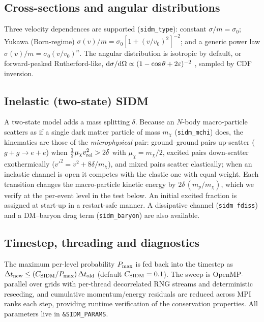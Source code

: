\documentclass[11pt,a4paper]{article}
\newcommand{\code}[1]{\texttt{#1}}
\begin{document}
\subsection{Cross-sections and angular distributions}

Three velocity dependences are supported
(\code{sidm\_type}): constant $\sigma/m=\sigma_0$; Yukawa
(Born-regime) $\sigma(v)/m = \sigma_0[1+(v/v_0)^2]^{-2}$; and a
generic power law $\sigma(v)/m=\sigma_0(v/v_0)^n$. The angular
distribution is isotropic by default, or forward-peaked
Rutherford-like,
${\rm d}\sigma/{\rm d}\Omega \propto (1-\cos\theta+2\varepsilon)^{-2}$
\citep{Kahlhoefer2014}, sampled by CDF inversion.

\subsection{Inelastic (two-state) SIDM}

A two-state model \citep{TuckerSmithWeiner2001,Vogelsberger2019}
adds a mass splitting $\delta$. Because an $N$-body macro-particle
scatters as if a single dark matter particle of mass $m_\chi$
(\code{sidm\_mchi}) does, the kinematics are those of the
\emph{microphysical} pair: ground--ground pairs up-scatter
($g+g\to e+e$) when $\tfrac12\mu_\chi v_{\rm rel}^2>2\delta$ with
$\mu_\chi=m_\chi/2$, excited pairs down-scatter exothermically
($v'^2=v^2+8\delta/m_\chi$), and mixed pairs scatter elastically;
when an inelastic channel is open it competes with the elastic one
with equal weight. Each transition changes the macro-particle
kinetic energy by $2\delta\,(m_p/m_\chi)$, which we verify at the
per-event level in the test below.
An initial excited fraction is assigned at start-up in a
restart-safe manner. A dissipative channel
(\code{sidm\_fdiss}) and a DM--baryon drag term
(\code{sidm\_baryon}) are also available.

\subsection{Timestep, threading and diagnostics}

The maximum per-level probability $P_{\rm max}$ is fed back into
the timestep as
$\Delta t_{\rm new}\le (C_{\rm SIDM}/P_{\rm max})\,\Delta t_{\rm old}$
(default $C_{\rm SIDM}=0.1$). The sweep is OpenMP-parallel over
grids with per-thread decorrelated RNG streams and deterministic
reseeding, and cumulative momentum/energy residuals are reduced
across MPI ranks each step, providing runtime verification of the
conservation properties. All parameters live in
\code{\&SIDM\_PARAMS}.
\end{document}
